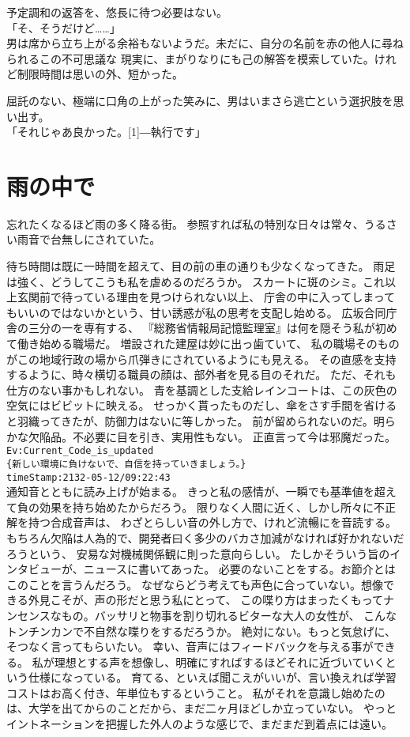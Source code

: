 \documentclass[../NenokuniMain]{subfiles}
\begin{document}
予定調和の返答を、悠長に待つ必要はない。\\
「そ、そうだけど……」\\
男は席から立ち上がる余裕もないようだ。未だに、自分の名前を赤の他人に尋ねられるこの不可思議な
現実に、まがりなりにも己の解答を模索していた。けれど制限時間は思いの外、短かった。

屈託のない、極端に口角の上がった笑みに、男はいまさら逃亡という選択肢を思い出す。\\
「それじゃあ良かった。\scalebox{2}[1]{―}執行です」\\

\section{雨の中で}
忘れたくなるほど雨の多く降る街。
参照すれば私の特別な日々は常々、うるさい雨音で台無しにされていた。

待ち時間は既に一時間を超えて、目の前の車の通りも少なくなってきた。
雨足は強く、どうしてこうも私を虐めるのだろうか。
スカートに斑のシミ。これ以上玄関前で待っている理由を見つけられない以上、
庁舎の中に入ってしまってもいいのではないかという、甘い誘惑が私の思考を支配し始める。
広坂合同庁舎の三分の一を専有する、
『総務省情報局記憶監理室』は何を隠そう私が初めて働き始める職場だ。
増設された建屋は妙に出っ歯ていて、
私の職場そのものがこの地域行政の場から爪弾きにされているようにも見える。
その直感を支持するように、時々横切る職員の顔は、部外者を見る目のそれだ。
ただ、それも仕方のない事かもしれない。
青を基調とした支給レインコートは、この灰色の空気にはビビットに映える。
せっかく貰ったものだし、傘をさす手間を省けると羽織ってきたが、防御力はないに等しかった。
前が留められないのだ。明らかな欠陥品。不必要に目を引き、実用性もない。
正直言って今は邪魔だった。\\
{\tt Ev:Current\_Code\_is\_updated\\
\{新しい環境に負けないで、自信を持っていきましょう。\}\\
timeStamp:2132-05-12/09:22:43}\\
通知音とともに読み上げが始まる。
きっと私の感情が、一瞬でも基準値を超えて負の効果を持ち始めたからだろう。
限りなく人間に近く、しかし所々に不正解を持つ合成音声は、
わざとらしい音の外し方で、けれど流暢にを音読する。
もちろん欠陥は人為的で、開発者曰く多少のバカさ加減がなければ好かれないだろうという、
安易な対機械関係観に則った意向らしい。
たしかそういう旨のインタビューが、ニュースに書いてあった。
必要のないことをする。お節介とはこのことを言うんだろう。
なぜならどう考えても声色に合っていない。想像できる外見こそが、声の形だと思う私にとって、
この喋り方はまったくもってナンセンスなもの。バッサリと物事を割り切れるビターな大人の女性が、
こんなトンチンカンで不自然な喋りをするだろうか。
絶対にない。もっと気怠げに、そつなく言ってもらいたい。
幸い、音声にはフィードバックを与える事ができる。
私が理想とする声を想像し、明確にすればするほどそれに近づいていくという仕様になっている。
育てる、といえば聞こえがいいが、言い換えれば学習コストはお高く付き、年単位もするということ。
私がそれを意識し始めたのは、大学を出てからのことだから、まだ二ヶ月ほどしか立っていない。
やっとイントネーションを把握した外人のような感じで、まだまだ到着点には遠い。
\end{document}
